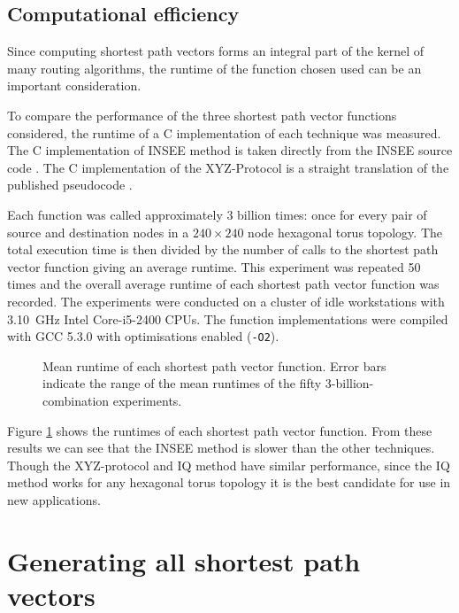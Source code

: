 		\subsection{Computational efficiency}
			
			Since computing shortest path vectors forms an integral part of the
			kernel of many routing algorithms, the runtime of the function chosen
			used can be an important consideration.
			
			To compare the performance of the three shortest path vector functions
			considered, the runtime of a C implementation of each technique was
			measured. The C implementation of INSEE method is taken directly from the
			INSEE source code \cite{navaridas09}. The C implementation of the
			XYZ-Protocol is a straight translation of the published pseudocode
			\cite{hoffmann15}.
			
			Each function was called approximately 3 billion times: once for every
			pair of source and destination nodes in a $240\times240$ node hexagonal
			torus topology. The total execution time is then divided by the number of
			calls to the shortest path vector function giving an average runtime.
			This experiment was repeated 50 times and the overall average runtime of
			each shortest path vector function was recorded. The experiments were
			conducted on a cluster of idle workstations with 3.10~GHz Intel
			Core-i5-2400 CPUs. The function implementations were compiled with GCC
			5.3.0 with optimisations enabled (\verb|-O2|).
			
			\begin{figure}
				\center
				
				\caption{Mean runtime of each shortest path vector function. Error bars
				indicate the range of the mean runtimes of the fifty
				3-billion-combination experiments.}
				\label{fig:shortest-path-vector-runtimes}
			\end{figure}
			
			Figure \ref{fig:shortest-path-vector-runtimes} shows the runtimes of each
			shortest path vector function. From these results we can see that the
			INSEE method is slower than the other techniques. Though the XYZ-protocol
			and IQ method have similar performance, since the IQ method works for any
			hexagonal torus topology it is the best candidate for use in new
			applications.
	
	\section{Generating all shortest path vectors}
			
